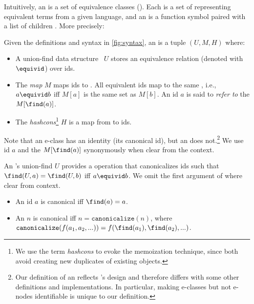 Intuitively,
  an \egraph is a set of equivalence classes (\textit{\eclasses}).
Each \eclass is a set of \textit{\enodes} representing equivalent terms from a given language,
  and an \enode is a function symbol paired with a list of children \eclasses.
More precisely:

\begin{definition}
  \label{def:egraph}

  Given the definitions and syntax in \autoref{fig:syntax},
  an \textit{\egraph} is a tuple $(U, M, H)$ where:
  \begin{itemize}
    \item
    A union-find data structure~\cite{unionfind} $U$
      stores an equivalence relation (denoted with $\equivid$)
      over \eclass ids.

    \item
    The \textit{\eclass map} $M$ maps \eclass ids to \eclasses.
    All equivalent \eclass ids map to the same \eclass, i.e.,
      $a \equivid b$ iff $M[a]$ is the same set as $M[b]$.
    An \eclass id $a$ is said to \textit{refer to} the \eclass $M[\find(a)]$.

    \item The \textit{hashcons}\footnote{
      We use the term \textit{hashcons} to evoke the memoization technique,
      since both avoid creating new duplicates of existing objects.
    }
    $H$ is a map from \enodes to \eclass ids.
  \end{itemize}


  Note that an e-class has an identity
   (its canonical \eclass id),
   but an \enode does not.\footnote{
    Our definition of an \egraph reflects \egg's design
      and therefore differs with some other \egraph definitions and implementations.
    In particular, making e-classes but not e-nodes identifiable is unique to
      our definition.
  }
  We use \eclass id $a$ and the \eclass $M[\find(a)]$ synonymously when clear from the context.

\end{definition}

\begin{definition}[Canonicalization]
    An \egraph's union-find $U$ provides a \find operation that canonicalizes \eclass ids
      such that ${\find(U, a) = \find(U, b)}$ iff ${a \equivid b}$.
    We omit the first argument of \find where clear from context.
    \begin{itemize}
      \item An \eclass id $a$ is canonical iff $\find(a) = a$.
      \item \raggedright
            An \enode $n$ is canonical iff $n = \texttt{canonicalize}(n)$,
            where ${\texttt{canonicalize}(f(a_{1}, a_{2}, ...)) = f(\find(a_{1}), \find(a_{2}), ...)}$.
    \end{itemize}
\end{definition}

